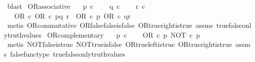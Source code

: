 \begin{isabellebody}
\ blast%
\endisatagproof
{\isafoldproof}%
%
\isadelimproof
\isanewline
%
\endisadelimproof
\isanewline
{}\isamarkupfalse%
\ OR{\isacharunderscore}{\kern0pt}associative{\isacharcolon}{\kern0pt}\isanewline
\ \ \ {\isachardoublequoteopen}p\ {\isasymin}\isactrlsub c\ {\isasymOmega}{\isachardoublequoteclose}\isanewline
\ \ \ {\isachardoublequoteopen}q\ {\isasymin}\isactrlsub c\ {\isasymOmega}{\isachardoublequoteclose}\isanewline
\ \ \ {\isachardoublequoteopen}r\ {\isasymin}\isactrlsub c\ {\isasymOmega}{\isachardoublequoteclose}\isanewline
\ \ \ {\isachardoublequoteopen}OR\ {\isasymcirc}\isactrlsub c\ {\isasymlangle}OR\ {\isasymcirc}\isactrlsub c\ {\isasymlangle}p{\isacharcomma}{\kern0pt}q{\isasymrangle}{\isacharcomma}{\kern0pt}\ r{\isasymrangle}\ {\isacharequal}{\kern0pt}\ OR\ {\isasymcirc}\isactrlsub c\ {\isasymlangle}p{\isacharcomma}{\kern0pt}\ OR\ {\isasymcirc}\isactrlsub c\ {\isasymlangle}q{\isacharcomma}{\kern0pt}r{\isasymrangle}{\isasymrangle}{\isachardoublequoteclose}\isanewline
%
\isadelimproof
\ \ %
\endisadelimproof
%
\isatagproof
{}\isamarkupfalse%
\ {\isacharparenleft}{\kern0pt}metis\ OR{\isacharunderscore}{\kern0pt}commutative\ OR{\isacharunderscore}{\kern0pt}false{\isacharunderscore}{\kern0pt}false{\isacharunderscore}{\kern0pt}is{\isacharunderscore}{\kern0pt}false\ OR{\isacharunderscore}{\kern0pt}true{\isacharunderscore}{\kern0pt}right{\isacharunderscore}{\kern0pt}is{\isacharunderscore}{\kern0pt}true\ assms\ true{\isacharunderscore}{\kern0pt}false{\isacharunderscore}{\kern0pt}only{\isacharunderscore}{\kern0pt}truth{\isacharunderscore}{\kern0pt}values{\isacharparenright}{\kern0pt}%
\endisatagproof
{\isafoldproof}%
%
\isadelimproof
\isanewline
%
\endisadelimproof
\isanewline
{}\isamarkupfalse%
\ OR{\isacharunderscore}{\kern0pt}complementary{\isacharcolon}{\kern0pt}\isanewline
\ \ \ {\isachardoublequoteopen}p\ {\isasymin}\isactrlsub c\ {\isasymOmega}{\isachardoublequoteclose}\isanewline
\ \ \ {\isachardoublequoteopen}OR\ {\isasymcirc}\isactrlsub c\ {\isasymlangle}p{\isacharcomma}{\kern0pt}\ NOT\ {\isasymcirc}\isactrlsub c\ p{\isasymrangle}\ {\isacharequal}{\kern0pt}\ \ {\isasymt}{\isachardoublequoteclose}\isanewline
%
\isadelimproof
\ \ %
\endisadelimproof
%
\isatagproof
{}\isamarkupfalse%
\ {\isacharparenleft}{\kern0pt}metis\ NOT{\isacharunderscore}{\kern0pt}false{\isacharunderscore}{\kern0pt}is{\isacharunderscore}{\kern0pt}true\ NOT{\isacharunderscore}{\kern0pt}true{\isacharunderscore}{\kern0pt}is{\isacharunderscore}{\kern0pt}false\ OR{\isacharunderscore}{\kern0pt}true{\isacharunderscore}{\kern0pt}left{\isacharunderscore}{\kern0pt}is{\isacharunderscore}{\kern0pt}true\ OR{\isacharunderscore}{\kern0pt}true{\isacharunderscore}{\kern0pt}right{\isacharunderscore}{\kern0pt}is{\isacharunderscore}{\kern0pt}true\ assms\ false{\isacharunderscore}{\kern0pt}func{\isacharunderscore}{\kern0pt}type\ true{\isacharunderscore}{\kern0pt}false{\isacharunderscore}{\kern0pt}only{\isacharunderscore}{\kern0pt}truth{\isacharunderscore}{\kern0pt}values{\isacharparenright}{\kern0pt}%

\end{isabellebody}
